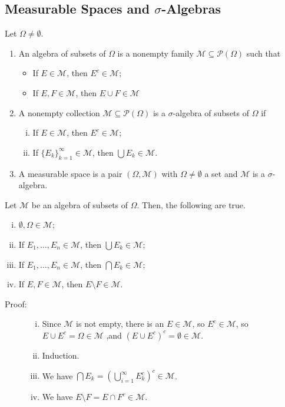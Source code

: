 \documentclass[10pt]{extarticle}
\begin{document}
  \subsection{Measurable Spaces and $\sigma$-Algebras}%
  Let $\Omega \neq \emptyset$.
  \begin{enumerate}[(1)]
    \item An algebra of subsets of $\Omega$ is a nonempty family $\mathcal{M}\subseteq \mathcal{P}(\Omega)$ such that
      \begin{itemize}
        \item If $E\in \mathcal{M}$, then $E^c\in \mathcal{M}$;
        \item If $E,F\in \mathcal{M}$, then $E\cup F\in \mathcal{M}$
      \end{itemize}
    \item A nonempty collection $\mathcal{M}\subseteq \mathcal{P}(\Omega)$ is a $\sigma$-algebra of subsets of $\Omega$ if
      \begin{enumerate}[(i)]
        \item If $E\in \mathcal{M}$, then $E^{c}\in \mathcal{M}$;
        \item If $\{E_k\}_{k=1}^{\infty}\in \mathcal{M}$, then $\bigcup E_k \in \mathcal{M}$.
      \end{enumerate}
    \item A measurable space is a pair $(\Omega,\mathcal{M})$ with $\Omega \neq \emptyset$ a set and $\mathcal{M}$ is a $\sigma$-algebra.
  \end{enumerate}
  Let $\mathcal{M}$ be an algebra of subsets of $\Omega$. Then, the following are true.
  \begin{enumerate}[(i)]
    \item $\emptyset,\Omega \in \mathcal{M}$;
    \item If $E_1,\dots,E_n \in \mathcal{M}$, then $\bigcup E_k \in \mathcal{M}$;
    \item If $E_1,\dots,E_n \in \mathcal{M}$, then $\bigcap E_k \in \mathcal{M}$;
    \item If $E,F\in \mathcal{M}$, then $E\setminus F\in \mathcal{M}$.
  \end{enumerate}
  \begin{description}
    \item[Proof:] \hfill
      \begin{enumerate}[(i)]
        \item Since $\mathcal{M}$ is not empty, there is an $E\in \mathcal{M}$, so $E^c\in \mathcal{M}$, so $E\cup E^{c} = \Omega \in \mathcal{M}$ ,and $(E\cup E^{c})^{c} = \emptyset \in \mathcal{M}$.
        \item Induction.
        \item We have $\bigcap E_k = \left(\bigcup_{i=1}^{\infty}E_k^c\right)^c \in \mathcal{M}$.
        \item We have $E\setminus F = E\cap F^{c}\in \mathcal{M}$.
      \end{enumerate}
  \end{description}
\end{document}
